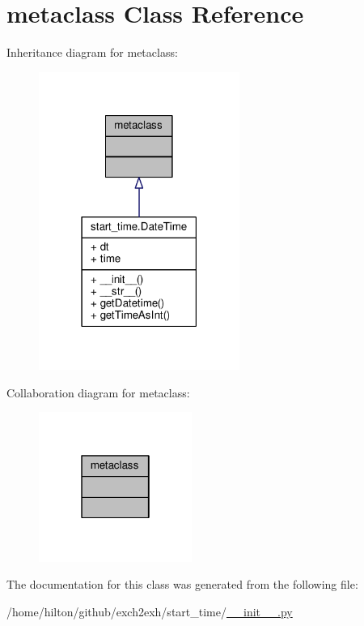\hypertarget{classmetaclass}{}\section{metaclass Class Reference}
\label{classmetaclass}


Inheritance diagram for metaclass\+:
\nopagebreak
\begin{figure}[H]
\begin{center}
\leavevmode
\includegraphics[width=186pt]{classmetaclass__inherit__graph}
\end{center}
\end{figure}


Collaboration diagram for metaclass\+:
\nopagebreak
\begin{figure}[H]
\begin{center}
\leavevmode
\includegraphics[width=142pt]{classmetaclass__coll__graph}
\end{center}
\end{figure}


The documentation for this class was generated from the following file\+:\begin{DoxyCompactItemize}
\item 
/home/hilton/github/exch2exh/start\+\_\+time/\hyperlink{start__time_2____init_____8py}{\+\_\+\+\_\+init\+\_\+\+\_\+.\+py}\end{DoxyCompactItemize}
